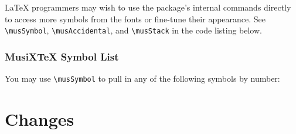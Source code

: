 \documentclass{article}
\begin{document}
\LaTeX{} programmers may wish to use the package's internal commands directly
to access more symbols from the fonts or fine-tune their appearance.
See \verb|\musSymbol|, \verb|\musAccidental|, and \verb|\musStack| in the code
listing below. 

\subsubsection{MusiX\TeX{} Symbol List}

You may use \verb|\musSymbol| to pull in any of the following symbols by
number:
\musixSymbolList

\section{Changes}
\end{document}
